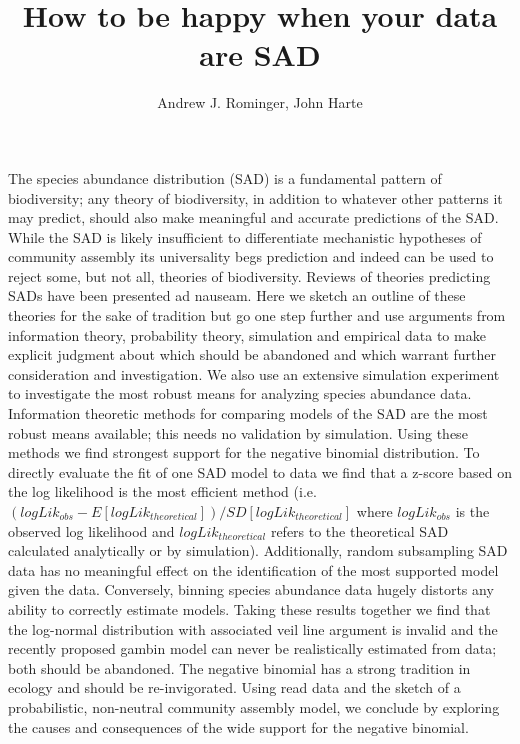 \documentclass[12pt]{article}
\title{How to be happy when your data are SAD}
\author{Andrew J. Rominger, John Harte}
\begin{document}
\maketitle

\clearpage

The species abundance distribution (SAD) is a fundamental pattern of
biodiversity; any theory of biodiversity, in addition to whatever
other patterns it may predict, should also make meaningful and
accurate predictions of the SAD. While the SAD is likely insufficient
to differentiate mechanistic hypotheses of community assembly its
universality begs prediction and indeed can be used to reject some,
but not all, theories of biodiversity. Reviews of theories predicting
SADs have been presented ad nauseam. Here we sketch an outline of
these theories for the sake of tradition but go one step further and
use arguments from information theory, probability theory, simulation
and empirical data to make explicit judgment about which should be
abandoned and which warrant further consideration and
investigation. We also use an extensive simulation experiment to
investigate the most robust means for analyzing species abundance
data. Information theoretic methods for comparing models of the SAD
are the most robust means available; this needs no validation by
simulation. Using these methods we find strongest support for the
negative binomial distribution. To directly evaluate the fit of one
SAD model to data we find that a z-score based on the log likelihood
is the most efficient method (i.e. $(logLik_{obs} -
E[logLik_{theoretical}]) / SD[logLik_{theoretical}]$ where $logLik_{obs}$ is
the observed log likelihood and $logLik_{theoretical}$ refers to the
theoretical SAD calculated analytically or by
simulation). Additionally, random subsampling SAD data has no
meaningful effect on the identification of the most supported model
given the data. Conversely, binning species abundance data hugely
distorts any ability to correctly estimate models.  Taking these
results together we find that the log-normal distribution with
associated veil line argument is invalid and the recently proposed
gambin model can never be realistically estimated from data; both
should be abandoned.  The negative binomial has a strong tradition in
ecology and should be re-invigorated.  Using read data and the sketch
of a probabilistic, non-neutral community assembly model, we conclude
by exploring the causes and consequences of the wide support for the
negative binomial.

\clearpage
\end{document}
